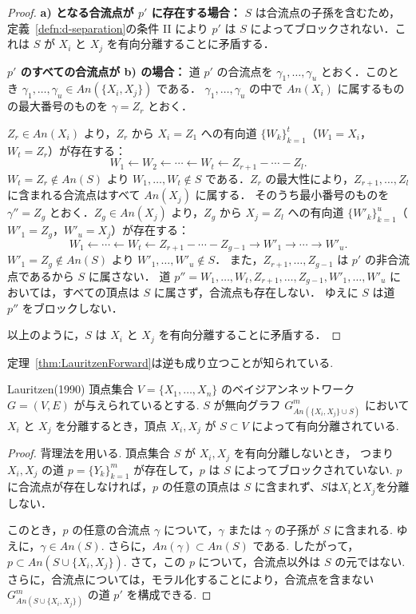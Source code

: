 \documentclass[uplatex, dvipdfmx]{jsarticle}
\begin{document}
\begin{proof}
  \noindent\textbf{a) となる合流点が $p'$ に存在する場合：}
  $S$ は合流点の子孫を含むため，定義~\ref{defn:d-separation}の条件 II により $p'$ は $S$ によってブロックされない．これは $S$ が $X_i$ と $X_j$ を有向分離することに矛盾する．

  \noindent\textbf{$p'$ のすべての合流点が b) の場合：}
  道 $p'$ の合流点を $\gamma_1, \dots, \gamma_u$ とおく．このとき $\gamma_1, \dots, \gamma_u \in An(\{X_i, X_j\})$ である．
  $\gamma_1, \dots, \gamma_u$ の中で $An(X_i)$ に属するものの最大番号のものを $\gamma = Z_r$ とおく．

  $Z_r \in An(X_i)$ より，$Z_r$ から $X_i = Z_1$ への有向道 $\{W_k\}_{k=1}^t$（$W_1 = X_i$，$W_t = Z_r$）が存在する：
  \[
    W_1 \leftarrow W_2 \leftarrow \cdots \leftarrow W_t \leftarrow Z_{r+1} - \cdots - Z_l.
  \]
  $W_t = Z_r \notin An(S)$ より $W_1, \dots, W_t \notin S$ である．$Z_r$ の最大性により，$Z_{r+1}, \dots, Z_l$ に含まれる合流点はすべて $An(X_j)$ に属する．
  そのうち最小番号のものを $\gamma'' = Z_g$ とおく．$Z_g \in An(X_j)$ より，$Z_g$ から $X_j = Z_l$ への有向道 $\{W'_k\}_{k=1}^u$（$W'_1 = Z_g$，$W'_u = X_j$）が存在する：
  \[
    W_1 \leftarrow \cdots \leftarrow W_t \leftarrow Z_{r+1} - \cdots - Z_{g-1} \to W'_1 \to \cdots \to W'_u.
  \]
  $W'_1 = Z_g \notin An(S)$ より $W'_1, \dots, W'_u \notin S$．
  また，$Z_{r+1}, \dots, Z_{g-1}$ は $p'$ の非合流点であるから $S$ に属さない．
  道 $p'' = W_1, \dots, W_t, Z_{r+1}, \dots, Z_{g-1}, W'_1, \dots, W'_u$ においては，すべての頂点は $S$ に属さず，合流点も存在しない．
  ゆえに $S$ は道 $p''$ をブロックしない．

  以上のように，$S$ は $X_i$ と $X_j$ を有向分離することに矛盾する．
\end{proof}

定理~\ref{thm:LauritzenForward}は逆も成り立つことが知られている.

\begin{thm}[label={thm:LauritzenBackward}]{Lauritzen(1990)}
  頂点集合 $V = \{X_1, \dots, X_n\}$ のベイジアンネットワーク $G = (V, E)$ が与えられているとする.
  $S$ が無向グラフ $G^m_{An(\{X_i, X_j\} \cup S)}$ において $X_i$ と $X_j$ を分離するとき，頂点 $X_i, X_j$ が $S \subset V$ によって有向分離されている.
\end{thm}

\begin{proof}
  背理法を用いる.
  頂点集合 $S$ が $X_i, X_j$ を有向分離しないとき，
  つまり $X_i, X_j$ の道 $p = \{Y_k\}_{k=1}^m$ が存在して，$p$ は $S$ によってブロックされていない.
  $p$に合流点が存在しなければ，$p$ の任意の頂点は $S$ に含まれず、$S$は$X_i$と$X_j$を分離しない．

  このとき，$p$ の任意の合流点 $\gamma$ について，$\gamma$ または $\gamma$ の子孫が $S$ に含まれる.
  ゆえに，$\gamma \in An(S)$.
  さらに，$An(\gamma) \subset An(S)$ である.
  したがって，$p \subset An(S \cup \{X_i, X_j\})$.
  さて，この $p$ について，合流点以外は $S$ の元ではない.
  さらに，合流点については，モラル化することにより，合流点を含まない $G^m_{An(S \cup \{X_i, X_j\})}$ の道 $p'$ を構成できる.
\end{proof}
\end{document}

